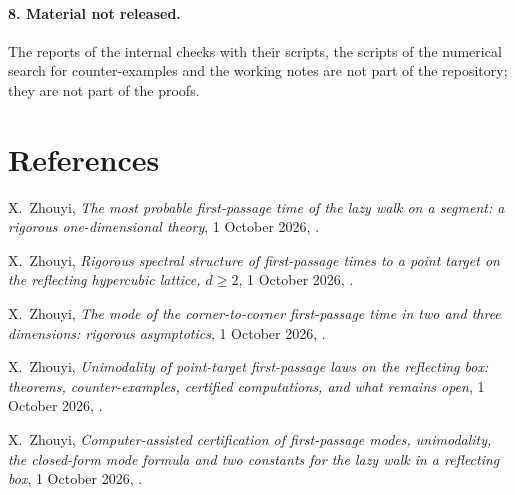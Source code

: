 \documentclass[10pt,a4paper]{article}
\theoremstyle{plain}
\theoremstyle{definition}
\newcommand{\ONE}{\textsf{1D}}
\newcommand{\SPE}{\textsf{SP}}
\newcommand{\ASY}{\textsf{AS}}
\newcommand{\UNI}{\textsf{UN}}
\newcommand{\CER}{\textsf{CE}}
\begin{document}
\paragraph{8. Material not released.} The reports of the internal checks with their scripts, the scripts of the numerical search for counter-examples and the working notes are not part of the repository; they are not part of the proofs.

\section*{References}
\begin{description}[style=nextline,leftmargin=2.2em]
\item[\ONE] X.~Zhouyi, \emph{The most probable first-passage time of the lazy walk on a segment: a rigorous one-dimensional theory}, 1 October 2026, .
\item[\SPE] X.~Zhouyi, \emph{Rigorous spectral structure of first-passage times to a point target on the reflecting hypercubic lattice, $d\ge2$}, 1 October 2026, .
\item[\ASY] X.~Zhouyi, \emph{The mode of the corner-to-corner first-passage time in two and three dimensions: rigorous asymptotics}, 1 October 2026, .
\item[\UNI] X.~Zhouyi, \emph{Unimodality of point-target first-passage laws on the reflecting box: theorems, counter-examples, certified computations, and what remains open}, 1 October 2026, .
\item[\CER] X.~Zhouyi, \emph{Computer-assisted certification of first-passage modes, unimodality, the closed-form mode formula and two constants for the lazy walk in a reflecting box}, 1 October 2026, .
\end{description}
\end{document}
